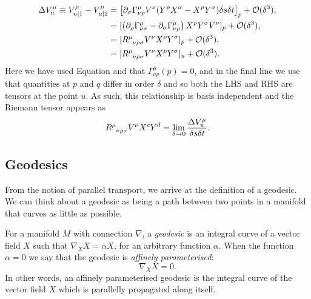 \begin{equation*}
	\begin{aligned}
		\Delta V^\mu_u \equiv V^\mu_{u |1} - V^\mu_{u |2} &=  \left[ \partial_\sigma \Gamma^\mu_{\nu \rho} V^\nu (Y^\rho X^\sigma - X^\rho Y^\sigma ) \delta s \delta t \right]_p + \Op(\delta^3),\\
		&= [\left(\partial_\rho \Gamma^\mu_{\nu \sigma} - \partial_\sigma \Gamma^\mu_{\nu \rho}  \right) X^\rho Y^\sigma V^\nu]_p + \Op(\delta^3),\\
		&= [\tensor{R}{^\mu_{\nu \rho \sigma}} V^\nu X^\rho Y^\sigma ]_p + \Op(\delta^3), \\
		&= [\tensor{R}{^\mu_{\nu \rho \sigma}} V^\nu X^\rho Y^\sigma ]_u + \Op(\delta^3).
	\end{aligned}
\end{equation*}
Here we have used Equation  and that $\Gamma_{\nu \rho}^\mu(p) = 0$, and in the final line we use that quantities at $p$ and $q$ differ in order $\delta$ and so both the LHS and RHS are tensors at the point $u$. As such, this relationship is basis independent and the Riemann tensor appears as
\begin{equation*}
  \tensor{R}{^\mu_{\nu \rho \sigma}} V^\nu X^c Y^d = \lim_{\delta \rightarrow 0} \frac{\Delta V^\mu_u}{\delta s \delta t}.
\end{equation*}

\subsection{Geodesics}

From the notion of parallel transport, we arrive at the definition of a geodesic. We can think about a geodesic as being a path between two points in a manifold that curves as little as possible. 
\begin{defn}
For a manifold $M$ with connection $\nabla$, a \emph{geodesic} is an integral curve of a vector field $X$ such that $\nabla_X X = \alpha X$, for an arbitrary function $\alpha$. When the function $\alpha = 0$ we say that the geodesic is \emph{affinely parameterised}:
	\begin{equation}
	\label{eq:geod}
	\nabla_X X = 0.
	\end{equation}
	In other words, an affinely parameterised geodesic is the integral curve of the vector field $X$ which is parallelly propagated along itself.	
\end{defn}


